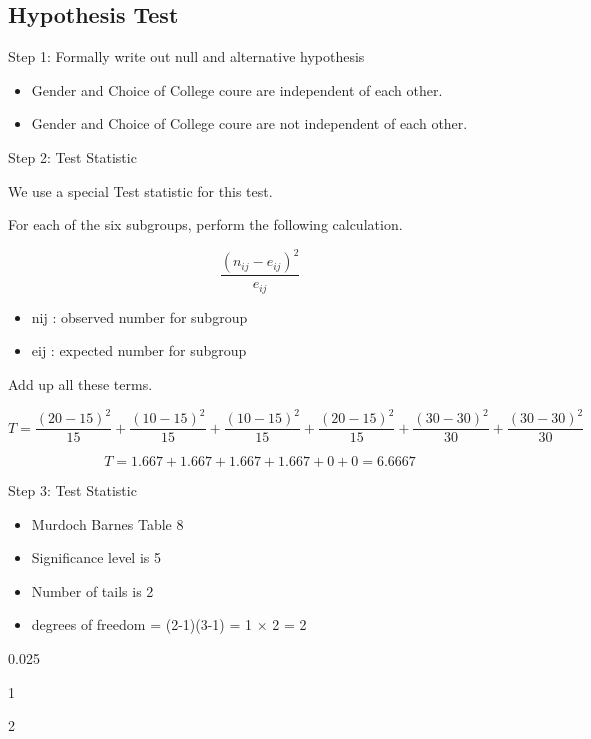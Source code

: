\documentclass[00-IntroStatsMaster.tex]{subfiles}
\begin{document}
\subsection{Hypothesis Test}

Step 1:  Formally write out null and alternative hypothesis

\begin{itemize}
	\item Gender and Choice of College coure are independent of each other.
	
	\item Gender and Choice of College coure are not independent of each other.
\end{itemize}

Step 2: Test Statistic

We use a special Test statistic for this test.

For each of the six subgroups, perform the following calculation.

\[\frac{(n_{ij}-e_{ij})^2}{e_{ij}}\]

\begin{itemize}
	\item nij : observed number for subgroup
	\item eij : expected number for subgroup
\end{itemize}


Add up all these terms.

\[T=\frac{(20-15)^2 }{15} + \frac{(10-15)^2 }{15} + \frac{(10-15)^2 }{15} + \frac{(20-15)^2 }{15} + \frac{(30-30)^2 }{30} + \frac{(30-30)^2 }{30}\]

\[
T= 1.667 + 1.667 +1.667 +1.667 +0 +0 = 6.6667 
\]



Step 3: Test Statistic

\begin{itemize}
	\item Murdoch Barnes Table 8
	\item Significance level is 5%
	\item Number of tails is 2
	\item degrees of freedom = (2-1)(3-1) = 1 $\times$ 2 = 2
\end{itemize}






0.025


1






2
\end{document}
